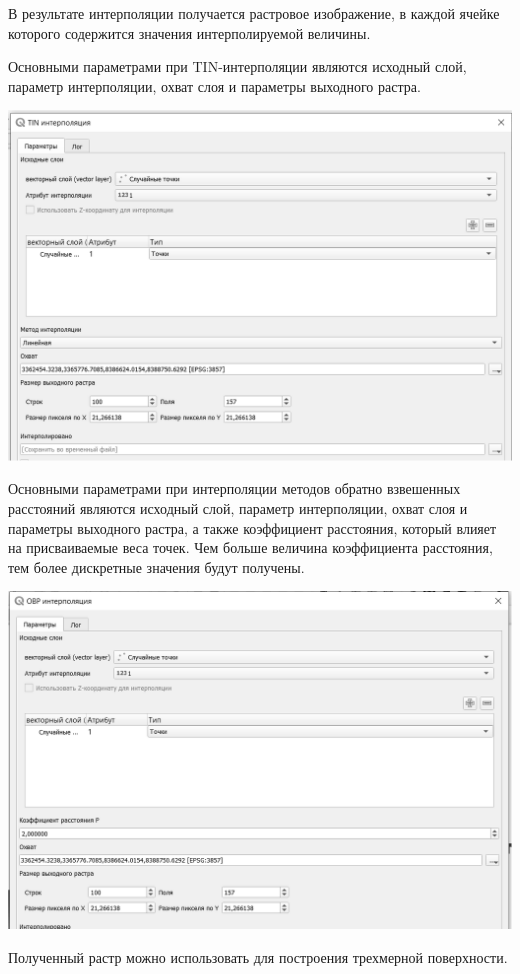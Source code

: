 \documentclass[
]{book}
\begin{document}
В результате интерполяции получается растровое изображение, в каждой ячейке которого содержится значения интерполируемой величины.

Основными параметрами при TIN-интерполяции являются исходный слой, параметр интерполяции, охват слоя и параметры выходного растра.

\includegraphics{figures/63.png}

Основными параметрами при интерполяции методов обратно взвешенных расстояний являются исходный слой, параметр интерполяции, охват слоя и параметры выходного растра, а также коэффициент расстояния, который влияет на присваиваемые веса точек. Чем больше величина коэффициента расстояния, тем более дискретные значения будут получены.

\includegraphics{figures/64.png}

Полученный растр можно использовать для построения трехмерной поверхности.
\end{document}
